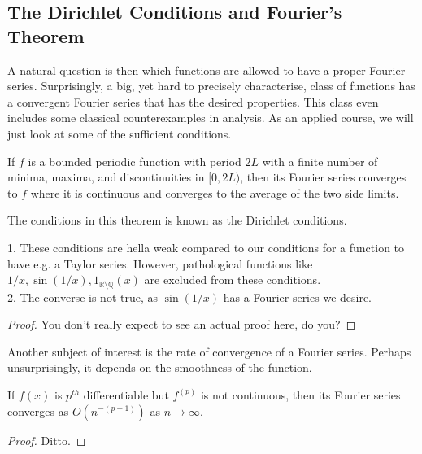 \subsection{The Dirichlet Conditions and Fourier's Theorem}
A natural question is then which functions are allowed to have a proper Fourier series.
Surprisingly, a big, yet hard to precisely characterise, class of functions has a convergent Fourier series that has the desired properties.
This class even includes some classical counterexamples in analysis.
As an applied course, we will just look at some of the sufficient conditions.
\begin{theorem}
    If $f$ is a bounded periodic function with period $2L$ with a finite number of minima, maxima, and discontinuities in $[0,2L)$, then its Fourier series converges to $f$ where it is continuous and converges to the average of the two side limits.
\end{theorem}
The conditions in this theorem is known as the Dirichlet conditions.
\begin{note}
    1. These conditions are hella weak compared to our conditions for a function to have e.g. a Taylor series.
    However, pathological functions like $1/x,\sin(1/x),1_{\mathbb R\setminus\mathbb Q}(x)$ are excluded from these conditions.\\
    2. The converse is not true, as $\sin(1/x)$ has a Fourier series we desire.
\end{note}
\begin{proof}
    You don't really expect to see an actual proof here, do you?
\end{proof}
Another subject of interest is the rate of convergence of a Fourier series.
Perhaps unsurprisingly, it depends on the smoothness of the function.
\begin{theorem}
    If $f(x)$ is $p^{th}$ differentiable but $f^{(p)}$ is not continuous, then its Fourier series converges as $O(n^{-(p+1)})$ as $n\to\infty$.
\end{theorem}
\begin{proof}
    Ditto.
\end{proof}
